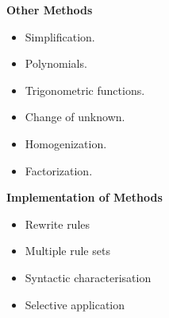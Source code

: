 \begin{center}
\begin{Huge}
{\bf Other Methods}		%
\end{Huge}
\end{center}

\begin{LARGE}
\begin{itemize}
\item Simplification.
\item Polynomials.
\item Trigonometric functions.
\item Change of unknown.
\item Homogenization.
\item Factorization.
\end{itemize}
\end{LARGE}
\newpage


\begin{center}
\begin{Huge}
{\bf Implementation of Methods}		%
\end{Huge}
\end{center}

\begin{LARGE}
\begin{itemize}
\item Rewrite rules
\item Multiple rule sets
\item Syntactic characterisation
\item Selective application
\end{itemize}
\end{LARGE}

